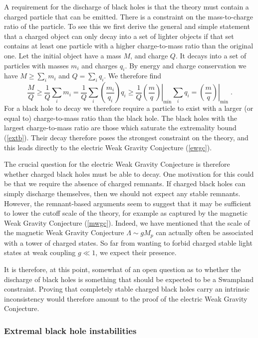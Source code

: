 \documentclass[11pt,a4paper]{article}
\numberwithin{equation}{section}
\numberwithin{table}{section}\setlength{\multlinegap}{25pt}
\newcommand{\be}{\begin{equation}}
\newcommand{\ee}{\end{equation}}
\begin{document}
A requirement for the discharge of black holes is that the theory must contain a charged particle that can be emitted. There is a constraint on the mass-to-charge ratio of the particle. To see this we first derive the general and simple statement that a charged object can only decay into a set of lighter objects if that set contains at least one particle with a higher charge-to-mass ratio than the original one. Let the initial object have a mass $M$, and charge $Q$. It decays into a set of particles with masses $m_i$ and charges $q_i$. By energy and charge conservation we have $M \geq \sum_i m_i$ and $Q = \sum_i q_i$. We therefore find
\be
\label{emcwgcdis}
\frac{M}{Q} \geq \frac{1}{Q} \sum_i m_i = \frac{1}{Q} \sum_i \left(\frac{m_i}{q_i}\right) q_i \geq \frac{1}{Q}\left.\left(\frac{m}{q}\right)\right|_{\mathrm{min}} \sum_i q_i = \left.\left(\frac{m}{q}\right)\right|_{\mathrm{min}}  \;.
\ee
For a black hole to decay we therefore require a particle to exist with a larger (or equal to) charge-to-mass ratio than the black hole. The black holes with the largest charge-to-mass ratio are those which saturate the extremality bound (\ref{extb}). Their decay therefore poses the strongest constraint on the theory, and this leads directly to the electric Weak Gravity Conjecture (\ref{ewgc}).  

The crucial question for the electric Weak Gravity Conjecture is therefore whether charged black holes must be able to decay. One motivation for this could be that we require the absence of charged remnants. If charged black holes can simply discharge themselves, then we should not expect any stable remnants. However, the remnant-based arguments seem to suggest that it may be sufficient to lower the cutoff scale of the theory, for example as captured by the magnetic Weak Gravity Conjecture (\ref{mwgc}). Indeed, we have mentioned that the scale of the magnetic Weak Gravity Conjecture $\Lambda \sim g M_p$ can actually often be associated with a tower of charged states. So far from wanting to forbid charged stable light states at weak coupling $g \ll 1$, we expect their presence. 

It is therefore, at this point, somewhat of an open question as to whether the discharge of black holes is something that should be expected to be a Swampland constraint. Proving that completely stable charged black holes carry an intrinsic inconsistency would therefore amount to the proof of the electric Weak Gravity Conjecture.

\subsubsection{Extremal black hole instabilities}
\label{sec:extbhins}
\end{document}
